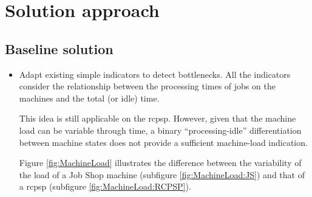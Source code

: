 \chapter{Solution approach}

\section{Baseline solution}

\begin{itemize}
    \item Adapt existing simple indicators to detect bottlenecks.
        All the indicators consider the relationship between the processing times of jobs on the machines
        and the total (or idle) time.
        
        This idea is still applicable on the \ac{rcpsp}. However, given that the machine load can be variable
        through time, a binary \enquote{processing-idle} differentiation between machine states does not
        provide a sufficient machine-load indication.

        Figure \ref{fig:MachineLoad} illustrates the difference between the variability of the load
        of a Job Shop machine (subfigure \ref{fig:MachineLoad:JS}) and that of a \ac{rcpsp}
        (subfigure \ref{fig:MachineLoad:RCPSP}).

    \begin{figure}[t]
      \centering

      \\


\end{figure}
\end{itemize}
